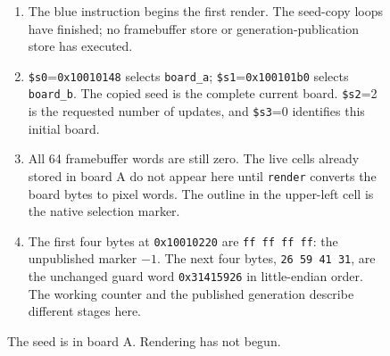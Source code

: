 \begin{figure}[htbp]
  \par\smallskip
  \begin{minipage}{\linewidth}
    \small
    \begin{enumerate}
      \item The blue instruction begins the first render. The seed-copy loops have finished; no framebuffer store or generation-publication store has executed.
      \item \texttt{\$s0}=\texttt{0x10010148} selects \texttt{board\_a}; \texttt{\$s1}=\texttt{0x100101b0} selects \texttt{board\_b}. The copied seed is the complete current board. \texttt{\$s2}=2 is the requested number of updates, and \texttt{\$s3}=0 identifies this initial board.
      \item All 64 framebuffer words are still zero. The live cells already stored in board A do not appear here until \texttt{render} converts the board bytes to pixel words. The outline in the upper-left cell is the native selection marker.
      \item The first four bytes at \texttt{0x10010220} are \texttt{ff ff ff ff}: the unpublished marker $-1$. The next four bytes, \texttt{26 59 41 31}, are the unchanged guard word \texttt{0x31415926} in little-endian order. The working counter and the published generation describe different stages here.
    \end{enumerate}
  \end{minipage}
  \caption{The seed is in board A. Rendering has not begun.}
  \label{capture:008-life-generations-f01-initial}
\end{figure}
\par
